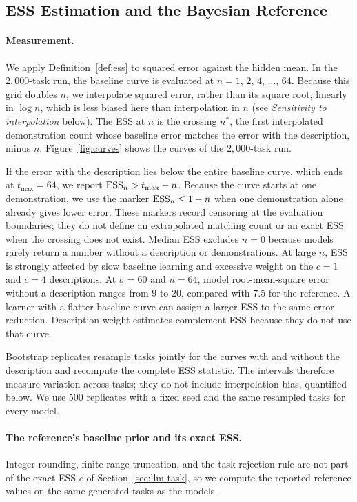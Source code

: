 \subsection{ESS Estimation and the Bayesian Reference}\label{sec:llm-ess}

\paragraph{Measurement.}
We apply Definition~\ref{def:ess} to squared error against the hidden mean. In the $2{,}000$-task run, the baseline curve is evaluated at $n = 1$, $2$, $4$, $\ldots$, $64$. Because this grid doubles $n$, we interpolate squared error, rather than its square root, linearly in $\log n$, which is less biased here than interpolation in $n$ (see \emph{Sensitivity to interpolation} below). The ESS at $n$ is the crossing $n^*$, the first interpolated demonstration count whose baseline error matches the error with the description, minus $n$. Figure~\ref{fig:curves} shows the curves of the $2{,}000$-task run.

If the error with the description lies below the entire baseline curve, which ends at $t_{\max}=64$, we report $\mathrm{ESS}_n > t_{\max}-n$. Because the curve starts at one demonstration, we use the marker $\mathrm{ESS}_n \leq 1-n$ when one demonstration alone already gives lower error. These markers record censoring at the evaluation boundaries; they do not define an extrapolated matching count or an exact ESS when the crossing does not exist. Median ESS excludes $n = 0$ because models rarely return a number without a description or demonstrations. At large $n$, ESS is strongly affected by slow baseline learning and excessive weight on the $c = 1$ and $c = 4$ descriptions. At $\sigma = 60$ and $n = 64$, model root-mean-square error without a description ranges from $9$ to $20$, compared with $7.5$ for the reference. A learner with a flatter baseline curve can assign a larger ESS to the same error reduction. Description-weight estimates complement ESS because they do not use that curve.

Bootstrap replicates resample tasks jointly for the curves with and without the description and recompute the complete ESS statistic. The intervals therefore measure variation across tasks; they do not include interpolation bias, quantified below. We use $500$ replicates with a fixed seed and the same resampled tasks for every model.

\paragraph{The reference's baseline prior and its exact ESS.}
Integer rounding, finite-range truncation, and the task-rejection rule are not part of the exact ESS $c$ of Section~\ref{sec:llm-task}, so we compute the reported reference values on the same generated tasks as the models.

